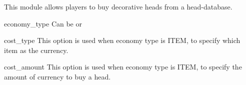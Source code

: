 
This module allows players to buy decorative heads from a head-database.



\begin{Configuration}
    \item[economy\_type]{Can be  or }
    \item[cost\_type]{This option is used when economy type is ITEM, to specify which item as the currency.}
    \item[cost\_amount]{This option is used when economy type is ITEM, to specify the amount of currency to buy a head.}
\end{Configuration}
